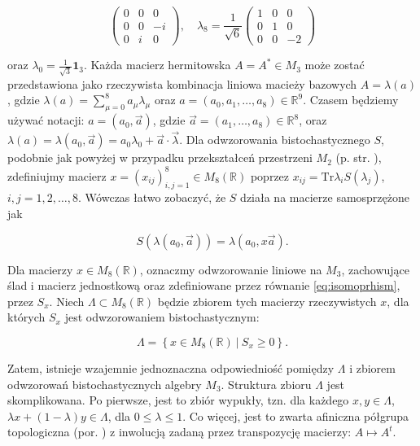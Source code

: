 {\begin{linenomath*}
\begin{equation}
\begin{pmatrix}
            0 & 0 & 0 \\
            0 & 0 & -i \\
            0 & i & 0
        \end{pmatrix}, \quad
    \lambda_{8} = \frac{1}{\sqrt{6}} \begin{pmatrix}
            1 & 0 & 0 \\
            0 & 1 & 0 \\
            0 & 0 & -2
        \end{pmatrix}
 \end{equation}
\end{linenomath*}
oraz $\lambda_{0} = \frac{1}{\sqrt{3}} \mathbf{1}_{3}$.
Każda macierz hermitowska $A = A^{*} \in M_{3}$ może zostać przedstawiona
jako rzeczywista kombinacja liniowa macieży bazowych $A = \lambda(a)$,
gdzie $\lambda(a) = \sum_{\mu=0}^{8} a_{\mu} \lambda_{\mu}$
oraz
$a = (a_{0}, a_{1}, \ldots, a_{8}) \in \mathbb{R}^{9}$.
Czasem będziemy używać notacji:
$a = (a_{0}, \vec{a})$,
gdzie $\vec{a} = (a_{1},\ldots,a_{8}) \in \mathbb{R}^{8}$,
oraz $\lambda(a) = \lambda(a_{0}, \vec{a}) = a_{0} \lambda_{0} + \vec{a} \cdot \vec{\lambda}$.
Dla odwzorowania bistochastycznego $S$,
podobnie jak powyżej w przypadku przekształceń przestrzeni $M_{2}$
(p. str. \pageref{def:PiofSiso}),
zdefiniujmy macierz $x = (x_{ij})_{i,j=1}^{8} \in M_{8}(\mathbb{R})$ poprzez
$x_{ij} = \text{Tr} \lambda_{i} S(\lambda_{j})$,
$i,j = 1,2,\ldots,8$.
Wówczas łatwo zobaczyć, że $S$ działa na macierze samosprzężone jak
\begin{linenomath*}
 \begin{equation}
\label{eq:isomoprhism}
S(\lambda(a_{0}, \vec{a})) = \lambda(a_{0}, x \vec{a}).
 \end{equation}
\end{linenomath*}
Dla macierzy $x \in M_{8}(\mathbb{R})$,
oznaczmy odwzorowanie liniowe na $M_{3}$,
zachowujące ślad i macierz jednostkową
oraz zdefiniowane przez równanie \eqref{eq:isomoprhism},
przez $S_{x}$.
Niech $\Lambda \subset M_{8}(\mathbb{R})$ będzie zbiorem tych macierzy
rzeczywistych $x$,
dla których $S_{x}$ jest odwzorowaniem bistochastycznym:
\begin{linenomath*}
 \begin{equation}
\Lambda = \left \{ x \in M_{8}(\mathbb{R}) \: |  \: S_{x} \geq 0 \right \}.
 \end{equation}
\end{linenomath*}
Zatem, istnieje wzajemnie jednoznaczna odpowiedniość pomiędzy $\Lambda$
i zbiorem odwzorowań bistochastycznych algebry $M_{3}$.
Struktura zbioru $\Lambda$ jest skomplikowana.
Po pierwsze, jest to zbiór wypukły,
tzn. dla każdego $x,y \in \Lambda$,
$\lambda x + (1-\lambda)y \in \Lambda$,
dla $0 \leq \lambda \leq 1$.
Co więcej, jest to zwarta afiniczna półgrupa topologiczna
(por. \cite{schwarz1955hausdorff,chow1975compact})
z inwolucją zadaną przez transpozycję macierzy: $A \mapsto A^{t}$.

}
